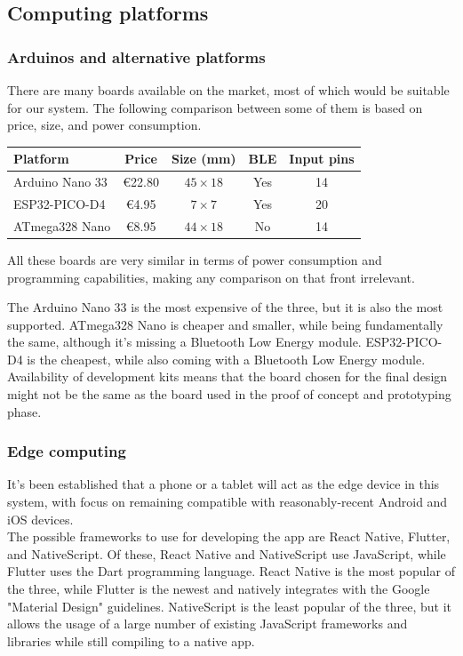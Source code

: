 \subsection{Computing platforms}
\subsubsection{Arduinos and alternative platforms}
There are many boards available on the market, most of which would be suitable for
our system. The following comparison between some of them is based on price, size,
and power consumption.
\begin{table}
    \renewcommand{\arraystretch}{2}
    \begin{tabularx}{\columnwidth}{|l|c|c|c|c|}
        \hline
        \textbf{Platform} & \textbf{Price} & \textbf{Size (mm)} & \textbf{BLE} & \textbf{Input pins} \\
        \hline
        Arduino Nano 33 & €22.80 & $45 \times 18$ & Yes & 14 \\
        \hline
        ESP32-PICO-D4 & €4.95 & $7 \times 7$ & Yes & 20 \\
        \hline
        ATmega328 Nano & €8.95 & $44 \times 18$ & No & 14 \\
        \hline
    \end{tabularx}
\end{table}

All these boards are very similar in terms of power consumption and programming
capabilities, making any comparison on that front irrelevant.

The Arduino Nano 33 is the most expensive of the three, but it is also the most
supported. ATmega328 Nano is cheaper and smaller, while being fundamentally the
same, although it's missing a Bluetooth Low Energy module. ESP32-PICO-D4 is the
cheapest, while also coming with a Bluetooth Low Energy module. Availability of
development kits means that the board chosen for the final design might not be the
same as the board used in the proof of concept and prototyping phase. 
\subsubsection{Edge computing}
It's been established that a phone or a tablet will act as the edge device in this
system, with focus on remaining compatible with reasonably-recent Android and iOS
devices. \\
The possible frameworks to use for developing the app are React Native, Flutter,
and NativeScript. Of these, React Native and NativeScript use JavaScript, while
Flutter uses the Dart programming language. React Native is the most popular of
the three, while Flutter is the newest and natively integrates with the Google
"Material Design" guidelines. NativeScript is the least popular of the three, but
it allows the usage of a large number of existing JavaScript frameworks and libraries
while still compiling to a native app. \\

